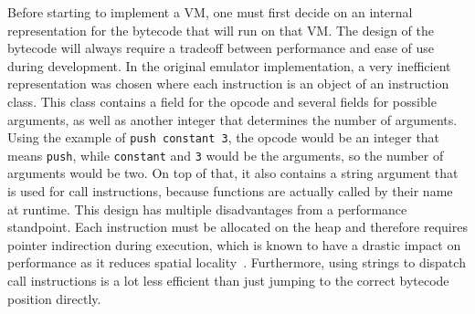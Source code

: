 \label{bytecode-implementation}
Before starting to implement a VM, one must first decide on an internal representation for the bytecode that will run on that VM.
The design of the bytecode will always require a tradeoff between performance and ease of use during development.
In the original emulator implementation, a very inefficient representation was chosen where each instruction is an object of an instruction class.
This class contains a field for the opcode and several fields for possible arguments, as well as another integer that determines the number of arguments.
Using the example of \verb+push constant 3+, the opcode would be an integer that means \verb+push+, while \verb+constant+ and \verb+3+ would be the arguments, so the number of arguments would be two.
On top of that, it also contains a string argument that is used for call instructions, because functions are actually called by their name at runtime.
This design has multiple disadvantages from a performance standpoint.
Each instruction must be allocated on the heap and therefore requires pointer indirection during execution, which is known to have a drastic impact on performance as it reduces spatial locality~\cite{6498541}.
Furthermore, using strings to dispatch call instructions is a lot less efficient than just jumping to the correct bytecode position directly.

